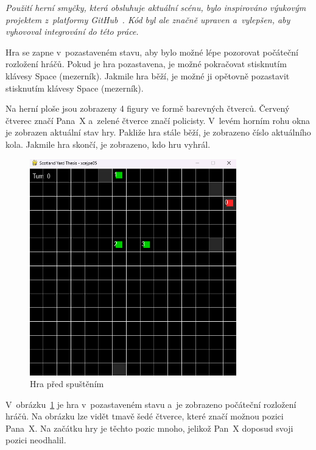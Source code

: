 \textit{Použití herní smyčky, která obsluhuje aktuální scénu, bylo inspirováno výukovým projektem z~platformy GitHub~\cite{GameSceneController}.
Kód byl ale značně upraven a~vylepšen, aby vyhovoval integrování do této práce.}

Hra se zapne v~pozastaveném stavu, aby bylo možné lépe pozorovat počáteční rozložení hráčů.
Pokud je hra pozastavena, je možné pokračovat stisknutím klávesy Space (mezerník).
Jakmile hra běží, je možné ji opětovně pozastavit stisknutím klávesy Space (mezerník).


Na herní ploše jsou zobrazeny 4 figury ve formě barevných čtverců.
Červený čtverec značí Pana~X a~zelené čtverce značí policisty.
V~levém horním rohu okna je zobrazen aktuální stav hry.
Pakliže hra stále běží, je zobrazeno číslo aktuálního kola.
Jakmile hra skončí, je zobrazeno, kdo hru vyhrál.
\begin{figure}[H]
	\centering
	\includegraphics[width=0.8\textwidth]{obrazky-figures/game_0}
    \caption{Hra před spuštěním}
    \label{fig:game_0}
\end{figure}

V~obrázku~\ref{fig:game_0} je hra v~pozastaveném stavu a~je zobrazeno počáteční rozložení hráčů.
Na obrázku lze vidět tmavě šedé čtverce, které značí možnou pozici Pana~X\@.
Na začátku hry je těchto pozic mnoho, jelikož Pan~X doposud svoji pozici neodhalil.

